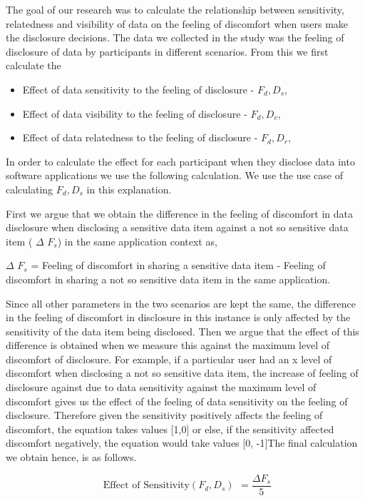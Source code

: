 \documentclass[conference]{IEEEtran}
\begin{document}
The goal of our research was to calculate the relationship between sensitivity, relatedness and visibility of data on the feeling of discomfort when users make the disclosure decisions. The data we collected in the study was the feeling of disclosure of data by participants in different scenarios. From this we first calculate the
\begin{itemize}
\item Effect of data sensitivity to the feeling of disclosure -  $F_d,D_s$, 
\item Effect of data visibility to the feeling of disclosure -  $F_d,D_v$, 
\item Effect of data relatedness to the feeling of disclosure -  $F_d,D_r$, 
\end{itemize}

In order to calculate the effect for each participant when they disclose data into software applications we use the following calculation. We use the use case of calculating  $F_d,D_s$ in this explanation.

First we argue that we obtain the difference in the feeling of discomfort in data disclosure when disclosing a sensitive data item against a not so sensitive data item ( $\Delta$ $F_s$) in the same application context as,

$\Delta$ $F_s$ = Feeling of discomfort in sharing a sensitive data item - Feeling of discomfort in sharing a not so sensitive data item in the same application.

Since all other parameters in the two scenarios are kept the same, the difference in the feeling of discomfort in disclosure in this instance is only affected by the sensitivity of the data item being disclosed. Then we argue that the effect of this difference is obtained when we measure this against the maximum level of discomfort of disclosure. For example, if a particular user had an x level of discomfort when disclosing a not so sensitive data item, the increase of feeling of disclosure against due to data sensitivity against the maximum level of discomfort gives us the effect of the feeling of data sensitivity on the feeling of disclosure. Therefore given the sensitivity positively affects the feeling of discomfort, the equation takes values [1,0] or else, if the sensitivity affected discomfort negatively, the equation would take values [0, -1]The final calculation we obtain hence, is as follows.


\[ \begin{aligned} \text{Effect of Sensitivity} (F_{d}, D_{s}) \end{aligned} =
\frac{\Delta F_{s}}%
 {5}
\]
\end{document}
